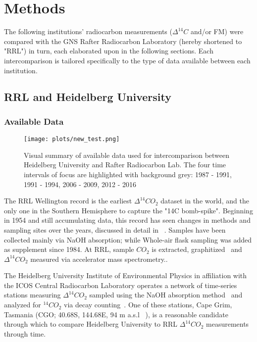 \newpage
\section{Methods}

The following institutions' radiocarbon measurements (${\Delta^{14}C}$ and/or FM) 
were compared with the GNS Rafter Radiocarbon Laboratory (hereby shortened to "RRL") in turn, each elaborated upon in the following sections. Each intercomparison is tailored specifically to the type of data available between each institution. 

\subsection{RRL and Heidelberg University}
\subsubsection{Available Data}
\label{section:AvailableData}
\begin{figure}[h!]
  \centering
  \texttt{[image: plots/new\_test.png]}
  \caption{Visual summary of available data used for intercomparison between Heidelberg University and Rafter Radiocarbon Lab. The four time intervals of focus are highlighted with background grey: 1987 - 1991, 1991 - 1994, 2006 - 2009, 2012 - 2016 }
  \label{fig:4timeintervals}
\end{figure}



\indent The RRL Wellington record is the earliest ${\Delta^{14}CO_{2}}$ dataset in the world, and the only one in the Southern Hemisphere to capture the "14C bomb-spike". Beginning in 1954 and still accumulating data, this record has seen changes in methods and sampling sites over the years, discussed in detail in ~\cite{turnbull2017}. Samples have been collected mainly via NaOH absorption; while Whole-air flask sampling was added as supplement since 1984. At RRL, sample ${CO_{2}}$ is extracted, graphitized~\cite{turnbull2015b} and ${\Delta^{14}CO_{2}}$ measured via accelerator mass spectrometry.\cite{turnbull2015b, ZONDERVAN201525}.

\indent The Heidelberg University Institute of Environmental Physics in affiliation with the ICOS Central Radiocarbon Laboratory operates a network of time-series stations measuring ${\Delta^{14}CO_{2}}$ sampled using the NaOH absorption method~\cite{levin1980, levin2010} and analyzed for ${^{14}CO_{2}}$ via decay counting~\cite{Kromer}. One of these stations, Cape Grim, Tasmania (CGO; 40.68S, 144.68E, 94 m a.s.l ~\cite{levin2010}), is a reasonable candidate through which to compare Heidelberg University to RRL ${\Delta^{14}CO_{2}}$ measurements through time. 

